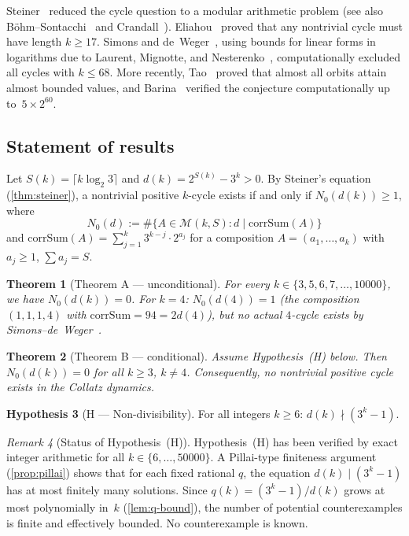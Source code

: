 \documentclass[11pt, a4paper]{amsart}
\theoremstyle{plain}
\newtheorem{theorem}{Theorem}[section]
\theoremstyle{definition}
\newtheorem{hypothesis}[theorem]{Hypothesis}
\theoremstyle{remark}
\newtheorem{remark}[theorem]{Remark}
\newcommand{\corrSum}{\mathrm{corrSum}}
\newcommand{\Mono}{\mathcal{M}}
\begin{document}
Steiner~\cite{Steiner1977} reduced the cycle question to a modular
arithmetic problem (see also B\"ohm--Sontacchi~\cite{BoehmSontacchi1978}
and Crandall~\cite{Crandall1978}).
Eliahou~\cite{Eliahou1993} proved that any
nontrivial cycle must have length $k \geq 17$.
Simons and de~Weger~\cite{SimonsDeWeger2005}, using bounds for
linear forms in logarithms due to Laurent, Mignotte, and
Nesterenko~\cite{LMN1995}, computationally excluded all cycles with
$k \leq 68$.  More recently, Tao~\cite{Tao2022} proved that almost all
orbits attain almost bounded values, and Barina~\cite{Barina2021}
verified the conjecture computationally up to~$5 \times 2^{60}$.

\subsection{Statement of results}\label{ssec:results}

Let $S(k) = \lceil k \log_2 3 \rceil$ and $d(k) = 2^{S(k)} - 3^k > 0$.
By Steiner's equation (\cref{thm:steiner}), a nontrivial positive
$k$-cycle exists if and only if $N_0(d(k)) \geq 1$, where
\begin{equation}\label{eq:n0}
  N_0(d) := \#\big\{A \in \Mono(k,S) :
  d \mid \corrSum(A)\big\}
\end{equation}
and $\corrSum(A) = \sum_{j=1}^{k} 3^{k-j} \cdot 2^{a_j}$
for a composition $A = (a_1, \ldots, a_k)$ with
$a_j \geq 1$, $\sum a_j = S$.

\begin{theorem}[Theorem A --- unconditional]\label{thm:A}
  For every $k \in \{3, 5, 6, 7, \ldots, 10000\}$,
  we have $N_0(d(k)) = 0$.  For $k = 4$:
  $N_0(d(4)) = 1$ (the composition $(1,1,1,4)$
  with $\corrSum = 94 = 2d(4)$), but no actual $4$-cycle exists
  by Simons--de~Weger~\cite{SimonsDeWeger2005}.
\end{theorem}

\begin{theorem}[Theorem B --- conditional]\label{thm:B}
  Assume Hypothesis~(H) below.  Then $N_0(d(k)) = 0$ for all
  $k \geq 3$, $k \neq 4$.  Consequently, no nontrivial positive
  cycle exists in the Collatz dynamics.
\end{theorem}

\begin{hypothesis}[H --- Non-divisibility]\label{hyp:H}
  For all integers $k \geq 6$:
  $d(k) \nmid (3^k - 1)$.
\end{hypothesis}

\begin{remark}[Status of Hypothesis~(H)]\label{rem:H-status}
  Hypothesis~(H) has been verified by exact integer arithmetic
  for all $k \in \{6, \ldots, 50000\}$.  A Pillai-type
  finiteness argument (\cref{prop:pillai}) shows that for
  each fixed rational $q$, the equation $d(k) \mid (3^k - 1)$
  has at most finitely many solutions.  Since $q(k) =
  (3^k - 1)/d(k)$ grows at most polynomially in~$k$
  (\cref{lem:q-bound}), the number of potential counterexamples
  is finite and effectively bounded.  No counterexample is
  known.
\end{remark}
\end{document}
